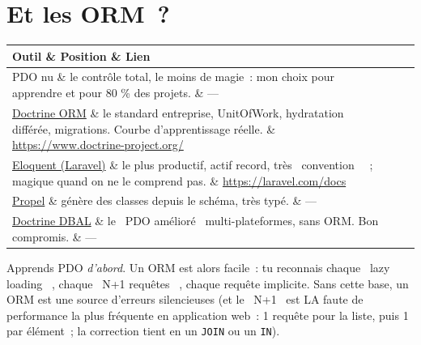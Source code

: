 \documentclass[12pt,a4paper,twoside,openright]{book}
\makeatletter
\newcommand{\link}[2]{\href{#2}{#1}}
\newenvironment{tabz}[1]{\rowcolors{2}{white}{tralight}%
  \small\setlength{\tabcolsep}{5pt}\setlength{\LTpre}{3pt}\setlength{\LTpost}{3pt}%
  \begin{longtable}{@{}#1@{}}\toprule}
  {\bottomrule\end{longtable}\normalfont\setlength{\tabcolsep}{6pt}}
\newcommand{\thd}[1]{\textbf{\color{white}#1}}
\newcommand{\headrow}{\rowcolor{theadbg}}
\makeatother
\begin{document}
\section{Et les ORM~?}

\begin{tabz}{lXl}
  \headrow \thd{Outil} \& \thd{Position} \& \thd{Lien} \\
  \midrule
  PDO nu \& le contr\^ole total, le moins de magie~: mon choix pour apprendre et pour 80 \% des projets. \& --- \\
  \link{Doctrine ORM}{https://www.doctrine-project.org/projects/orm.html} \& le standard entreprise, UnitOfWork, hydratation diff\'er\'ee, migrations. Courbe d'apprentissage r\'eelle. \& \url{https://www.doctrine-project.org/} \\
  \link{Eloquent (Laravel)}{https://laravel.com/docs/eloquent} \& le plus productif, actif record, tr\`es \og ~convention~ \fg{}~; magique quand on ne le comprend pas. \& \url{https://laravel.com/docs} \\
  \link{Propel}{https://propelorm.org/} \& g\'en\`ere des classes depuis le sch\'ema, tr\`es typ\'e. \& --- \\
  \link{Doctrine DBAL}{https://www.doctrine-project.org/projects/dbal.html} \& le \og ~PDO am\'elior\'e~ \fg{} multi-plateformes, sans ORM. Bon compromis. \& --- \\
\end{tabz}

\begin{astuce}
Apprends PDO \emph{d'abord}. Un ORM est alors facile~: tu reconnais chaque \og ~lazy loading~ \fg{},
chaque \og ~N+1 requ\^etes~ \fg{}, chaque requ\^ete implicite. Sans cette base, un ORM est une source
d'erreurs silencieuses (et le \og ~N+1~ \fg{} est LA faute de performance la plus fr\'equente en
application web~: 1 requ\^ete pour la liste, puis 1 par \'el\'ement~; la correction tient en un
\verb|JOIN| ou un \verb|IN|).
\end{astuce}
\end{document}
